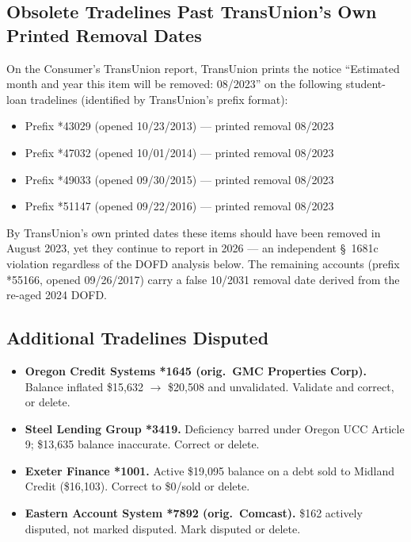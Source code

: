 \documentclass[12pt,letterpaper]{article}
\begin{document}
\subsection*{Obsolete Tradelines Past TransUnion's Own Printed Removal Dates}
On the Consumer's TransUnion report, TransUnion prints the notice ``Estimated month and year this item will be removed: 08/2023'' on the following student-loan tradelines (identified by TransUnion's prefix format):
\begin{itemize}[noitemsep]
  \item Prefix *43029 (opened 10/23/2013) --- printed removal 08/2023
  \item Prefix *47032 (opened 10/01/2014) --- printed removal 08/2023
  \item Prefix *49033 (opened 09/30/2015) --- printed removal 08/2023
  \item Prefix *51147 (opened 09/22/2016) --- printed removal 08/2023
\end{itemize}
By TransUnion's own printed dates these items should have been removed in August 2023, yet they continue to report in 2026 --- an independent \S~1681c violation regardless of the DOFD analysis below. The remaining accounts (prefix *55166, opened 09/26/2017) carry a false 10/2031 removal date derived from the re-aged 2024 DOFD.



\subsection*{Additional Tradelines Disputed}
\begin{itemize}[noitemsep]
  \item \textbf{Oregon Credit Systems *1645 (orig.\ GMC Properties Corp).} Balance inflated \$15,632 $\rightarrow$ \$20,508 and unvalidated. Validate and correct, or delete.
  \item \textbf{Steel Lending Group *3419.} Deficiency barred under Oregon UCC Article 9; \$13,635 balance inaccurate. Correct or delete.
  \item \textbf{Exeter Finance *1001.} Active \$19,095 balance on a debt sold to Midland Credit (\$16,103). Correct to \$0/sold or delete.
  \item \textbf{Eastern Account System *7892 (orig.\ Comcast).} \$162 actively disputed, not marked disputed. Mark disputed or delete.
\end{itemize}
\end{document}
